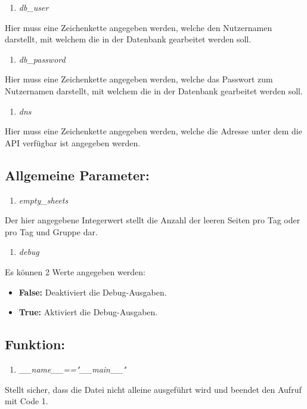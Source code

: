 \documentclass[12pt,parskip=full, pagea4]{scrreprt}
\begin{document}
			\begin{enumerate}[resume]
				\item \textit{db\_user}
			\end{enumerate}
			\leftskip=1.5cm	Hier muss eine Zeichenkette angegeben werden, welche den Nutzernamen darstellt, mit welchem die in der Datenbank gearbeitet werden soll.
			\begin{enumerate}[resume]
				\item \textit{db\_password}
			\end{enumerate}
			\leftskip=1.5cm	Hier muss eine Zeichenkette angegeben werden, welche das Passwort zum Nutzernamen darstellt, mit welchem die in der Datenbank gearbeitet werden soll.
			\begin{enumerate}[resume]
				\item \textit{dns}
			\end{enumerate}
			\leftskip=1.5cm	Hier muss eine Zeichenkette angegeben werden, welche die Adresse unter dem die API verfügbar ist angegeben werden.
			\subsection{Allgemeine Parameter:}
			\begin{enumerate}[resume]
				\item \textit{empty\_sheets}
			\end{enumerate}
			\leftskip=1.5cm	Der hier angegebene Integerwert stellt die Anzahl der leeren Seiten pro Tag oder pro Tag und Gruppe dar.
			\begin{enumerate}[resume]
				\item \textit{debug}
			\end{enumerate}
			\leftskip=1.5cm	Es können 2 Werte angegeben werden:
			\begin{itemize}
				\item \leftskip=1.5cm \textbf{False:} Deaktiviert die Debug-Ausgaben.
				\item \leftskip=1.5cm \textbf{True:} Aktiviert die Debug-Ausgaben.
			\end{itemize}
			\subsection{Funktion:}
			\begin{enumerate}[resume]
				\item \textit{\_\_name\_\_=="\_\_main\_\_"}	
			\end{enumerate}
			\leftskip=1.5cm	Stellt sicher, dass die Datei nicht alleine ausgeführt wird und beendet den Aufruf mit Code 1.
			
\end{document}

